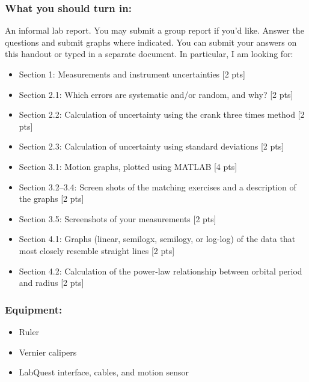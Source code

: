 \documentclass[11pt,letterpaper]{article}
\newcounter{question}[section]
\begin{document}
\subsubsection*{What you should turn in:}
An informal lab report. You may submit a group report if you'd like. Answer the questions and submit graphs where indicated. You can submit your answers on this handout or typed in a separate document. In particular, I am looking for: 
\begin{itemize}
\setlength{\parskip}{3pt}
\item Section 1: Measurements and instrument uncertainties [2 pts]
\item Section 2.1: Which errors are systematic and/or random, and why? [2 pts]
\item Section 2.2: Calculation of uncertainty using the crank three times method [2 pts]
\item Section 2.3: Calculation of uncertainty using standard deviations [2 pts]
\item Section 3.1: Motion graphs, plotted using MATLAB [4 pts]
\item Section 3.2--3.4: Screen shots of the matching exercises and a description of the graphs [2 pts]
\item Section 3.5: Screenshots of your measurements [2 pts]
\item Section 4.1: Graphs (linear, semilogx, semilogy, or log-log) of the data that most closely resemble straight lines [2 pts]
\item Section 4.2: Calculation of the power-law relationship between orbital period and radius [2 pts]
\end{itemize}

\subsubsection*{Equipment:}
\begin{itemize}
\setlength{\parskip}{3pt}
\item Ruler
\item Vernier calipers
\item LabQuest interface, cables, and motion sensor
\end{itemize}
\end{document}
